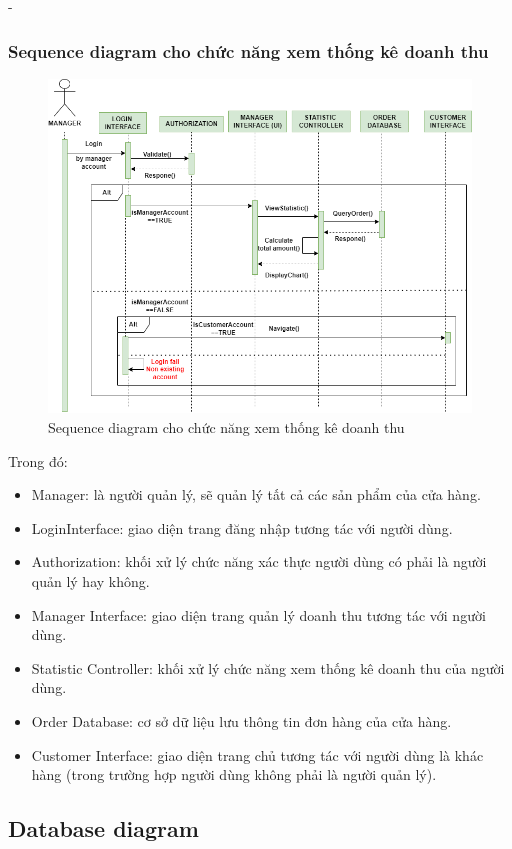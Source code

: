 \begin {list} {-}{}
\subsubsection{Sequence diagram cho chức năng xem thống kê doanh thu}
\begin{figure}[H]
    \centering
    \includegraphics[scale=0.5]{images/hieu/chap-3/statistic-sequence-diagram.png}
    \caption{Sequence diagram cho chức năng xem thống kê doanh thu}
\end{figure}
Trong đó:
\begin{itemize}
    \item Manager: là người quản lý, sẽ quản lý tất cả các sản phẩm của cửa hàng.
    \item LoginInterface: giao diện trang đăng nhập tương tác với người dùng.
    \item Authorization: khối xử lý chức năng xác thực người dùng có phải là người quản lý hay không.
    \item Manager Interface: giao diện trang quản lý doanh thu tương tác với người dùng.
    \item Statistic Controller: khối xử lý chức năng xem thống kê doanh thu của người dùng.
    \item Order Database: cơ sở dữ liệu lưu thông tin đơn hàng của cửa hàng.
    \item Customer Interface: giao diện trang chủ tương tác với người dùng là khác hàng (trong trường hợp người dùng không phải là người quản lý).
\end{itemize}
\newpage
\subsection{Database diagram}

\end{list}
